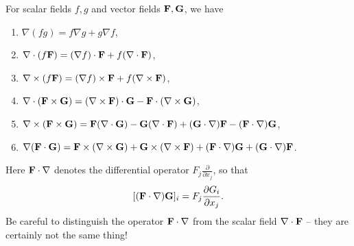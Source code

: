 \documentclass[a4paper]{scrartcl}
\begin{document}
\begin{proposition}
	For scalar fields $f, g$ and vector fields $\mathbf{F}, \mathbf{G}$, we have
	\begin{enumerate}[label=(\roman*)]
		\item $\nabla(fg) = f \nabla g + g \nabla f$,
		\item $\nabla \cdot (f \mathbf{F}) = (\nabla f) \cdot \mathbf{F} + f (\nabla \cdot \mathbf{F})$,
		\item $\nabla \times (f \mathbf{F}) = (\nabla f) \times \mathbf{F} + f (\nabla \times \mathbf{F})$,
		\item $\nabla \cdot (\mathbf{F} \times \mathbf{G}) = (\nabla \times \mathbf{F}) \cdot \mathbf{G} - \mathbf{F} \cdot (\nabla \times \mathbf{G})$,
		\item $\nabla \times (\mathbf{F} \times \mathbf{G}) = \mathbf{F} (\nabla \cdot \mathbf{G}) - \mathbf{G}(\nabla \cdot \mathbf{F}) + (\mathbf{G} \cdot \nabla) \mathbf{F} - (\mathbf{F} \cdot \nabla) \mathbf{G}$,
		\item $\nabla (\mathbf{F} \cdot \mathbf{G}) = \mathbf{F} \times (\nabla \times \mathbf{G}) + \mathbf{G} \times (\nabla \times \mathbf{F}) + (\mathbf{F} \cdot \nabla) \mathbf{G} + (\mathbf{G} \cdot \nabla) \mathbf{F}$.
	\end{enumerate}
\end{proposition}

Here $\mathbf{F} \cdot \nabla$ denotes the differential operator $F_j \frac{\partial}{\partial x_j}$, so that
$$
[(\mathbf{F} \cdot \nabla) \mathbf{G}]_i = F_j \frac{\partial G_i}{\partial x_j}.
$$
Be careful to distinguish the operator $\mathbf{F} \cdot \nabla$ from the scalar field $\nabla \cdot \mathbf{F}$ -- they are certainly not the same thing!
\end{document}
